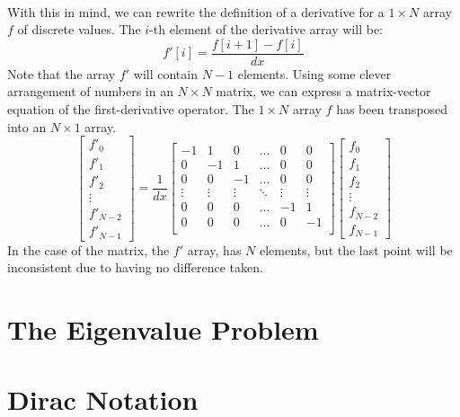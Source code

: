 \documentclass[12pt,letterpaper]{book}
\begin{document}
\paragraph*{}With this in mind, we can rewrite the definition of a derivative for a $1 \times N$ array $f$ of discrete values. The $i$-th element of the derivative array will be:
\begin{equation}
f'[i] = \frac{f[i+1] - f[i]}{dx}
\end{equation}
Note that the array $f'$ will contain $N-1$ elements. Using some clever arrangement of numbers in an $N \times N$ matrix, we can express a matrix-vector equation of the first-derivative operator. The $1 \times N$ array $f$ has been transposed into an $N \times 1$ array.
\begin{equation}
\label{1st-Deriv-Mat-Vec}
\begin{bmatrix}
f'_0 \\ f'_1 \\ f'_2 \\ \vdots \\ f'_{N-2} \\ f'_{N-1}
\end{bmatrix} = \frac{1}{dx}
\begin{bmatrix}
-1 & 1 & 0 & \hdots & 0 & 0 \\
0 & -1 & 1 & \hdots & 0 & 0 \\
0 & 0 & -1 & \hdots & 0 & 0 \\
\vdots & \vdots & \vdots & \ddots & \vdots & \vdots \\
0 & 0 & 0 & \hdots & -1 & 1 \\
0 & 0 & 0 & \hdots & 0 & -1 \\
\end{bmatrix}
\begin{bmatrix}
f_0 \\ f_1 \\ f_2 \\ \vdots \\ f_{N-2} \\ f_{N-1}
\end{bmatrix}
\end{equation}
In the case of the matrix, the $f'$ array, has $N$ elements, but the last point will be inconsistent due to having no difference taken.






\section{The Eigenvalue Problem}


\section{Dirac Notation}


\end{document}
